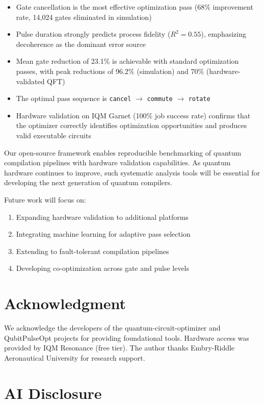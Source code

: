 \documentclass[journal]{IEEEtran}
\begin{document}
\begin{itemize}
    \item Gate cancellation is the most effective optimization pass (68\% improvement rate, 14,024 gates eliminated in simulation)
    \item Pulse duration strongly predicts process fidelity ($R^2 = 0.55$), emphasizing decoherence as the dominant error source
    \item Mean gate reduction of 23.1\% is achievable with standard optimization passes, with peak reductions of 96.2\% (simulation) and 70\% (hardware-validated QFT)
    \item The optimal pass sequence is \texttt{cancel} $\rightarrow$ \texttt{commute} $\rightarrow$ \texttt{rotate}
    \item Hardware validation on IQM Garnet (100\% job success rate) confirms that the optimizer correctly identifies optimization opportunities and produces valid executable circuits
\end{itemize}

Our open-source framework enables reproducible benchmarking of quantum compilation pipelines with hardware validation capabilities. As quantum hardware continues to improve, such systematic analysis tools will be essential for developing the next generation of quantum compilers.

Future work will focus on:
\begin{enumerate}
    \item Expanding hardware validation to additional platforms
    \item Integrating machine learning for adaptive pass selection
    \item Extending to fault-tolerant compilation pipelines
    \item Developing co-optimization across gate and pulse levels
\end{enumerate}

\section*{Acknowledgment}

We acknowledge the developers of the quantum-circuit-optimizer and QubitPulseOpt projects for providing foundational tools. Hardware access was provided by IQM Resonance (free tier). The author thanks Embry-Riddle Aeronautical University for research support.

\section*{AI Disclosure}
\end{document}
